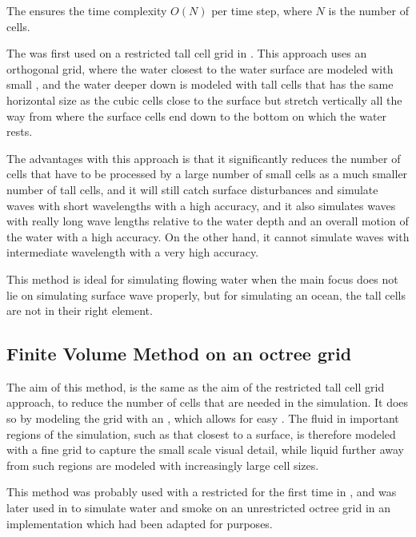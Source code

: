 The \FVM ensures the time complexity $O(N)$ per time step, where $N$ is the number of cells.

The \FVM was first used on a restricted tall cell grid in \citep{Chentanez2011}. This approach uses an orthogonal grid, where the water closest to the water surface are modeled with small , and the water deeper down is modeled with tall cells that has the same horizontal size as the cubic cells close to the surface but stretch vertically all the way from where the surface cells end down to the bottom on which the water rests.

The advantages with this approach is that it significantly reduces the number of cells that have to be processed by \approximating a large number of small cells as a much smaller number of tall cells, and it will still catch surface disturbances and simulate waves with short wavelengths with a high accuracy, and it also simulates waves with really long wave lengths relative to the water depth and an overall motion of the water with a high accuracy. On the other hand, it cannot simulate waves with intermediate wavelength with a very high accuracy.

This method is ideal for simulating flowing water when the main focus does not lie on simulating surface wave properly, but for simulating an ocean, the tall cells are not in their right element.

\subsection{Finite Volume Method on an octree grid}

The aim of this method, is the same as the aim of the restricted tall cell grid approach, to reduce the number of cells that are needed in the simulation. It does so by modeling the grid with an \octree, which allows for easy . The fluid in important regions of the simulation, such as that closest to a surface, is therefore modeled with a fine grid to capture the small scale visual detail, while liquid further away from such regions are modeled with increasingly large cell sizes.

This method was probably used with a restricted  for the first time in \citep{Popinet2003}, and was later used in \citealp{Losasso2004} to simulate water and smoke on an unrestricted octree grid in an implementation which had been adapted for  purposes. 

